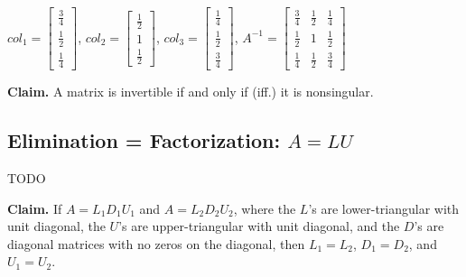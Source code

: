 \documentclass[12pt,a4paper]{article}
\begin{document}
$
col_1 = 
\begin{bmatrix}
  \frac{3}{4} \\
  \frac{1}{2} \\
  \frac{1}{4}
\end{bmatrix}
$, 
$
col_2 =
\begin{bmatrix}
  \frac{1}{2} \\
  1 \\
  \frac{1}{2}
\end{bmatrix}
$,
$
col_3 =
\begin{bmatrix}
  \frac{1}{4} \\
  \frac{1}{2} \\
  \frac{3}{4}
\end{bmatrix}
$,
$
A^{-1} =
\begin{bmatrix}
  \frac{3}{4} & \frac{1}{2} & \frac{1}{4} \\
  \frac{1}{2} & 1 & \frac{1}{2} \\
  \frac{1}{4} & \frac{1}{2} & \frac{3}{4}
\end{bmatrix}
$

\textbf{Claim.} A matrix is invertible if and only if (iff.) it is nonsingular.

\subsection*{Elimination = Factorization: $A = LU$}

TODO

\textbf{Claim.} If $A = L_1D_1U_1$ and $A = L_2D_2U_2$, where the $L$'s are lower-triangular with unit diagonal,
the $U$'s are upper-triangular with unit diagonal, and the $D$'s are diagonal matrices with no zeros on the diagonal,
then $L_1 = L_2$, $D_1 = D_2$, and $U_1 = U_2$.
\end{document}
